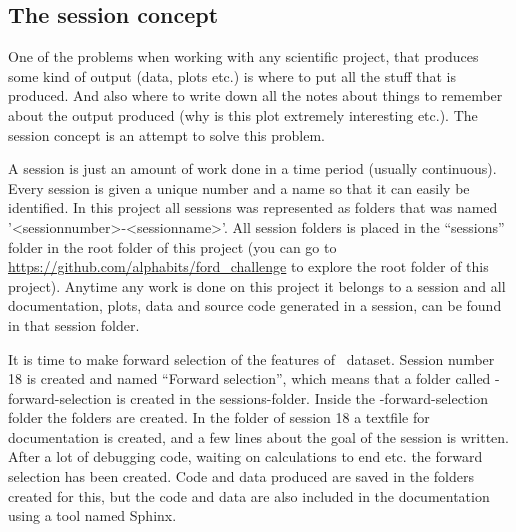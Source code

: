 \subsection{The session concept}
One of the problems when working with any scientific project, that produces some kind of output (data, plots etc.) is where to put all the stuff that is produced. And also where to write down all the notes about things to remember about the output produced (why is this plot extremely interesting etc.). The session concept is an attempt to solve this problem. \par
A session is just an amount of work done in a time period (usually continuous). Every session is given a unique number and a name so that it can easily be identified. In this project all sessions was represented as folders that was named '<sessionnumber>-<sessionname>'. All session folders is placed in the ``sessions'' folder in the root folder of this project (you can go to \url{https://github.com/alphabits/ford_challenge} to explore the root folder of this project). Anytime any work is done on this project it belongs to a session and all documentation, plots, data and source code generated in a session, can be found in that session folder.
\begin{Exa}
    It is time to make forward selection of the features of \TFC\ dataset. Session number 18 is created and named ``Forward selection'', which means that a folder called {-forward-selection} is created in the {\ttfamily sessions}-folder. Inside the {-forward-selection} folder the folders  are created. In the folder of session 18 a textfile for documentation is created, and a few lines about the goal of the session is written. After a lot of debugging code, waiting on calculations to end etc. the forward selection has been created. Code and data produced are saved in the folders created for this, but the code and data are also included in the documentation using a tool named Sphinx.
\end{Exa}

